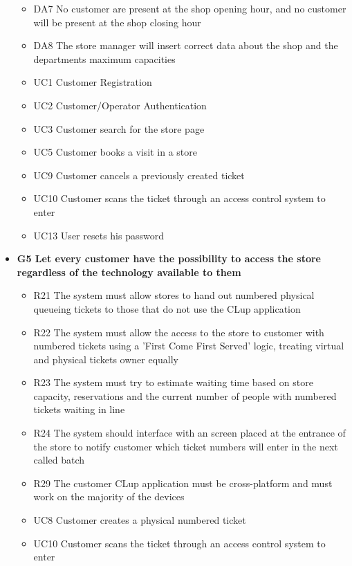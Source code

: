 \begin{itemize}
\begin{itemize}
        \item DA7 No customer are present at the shop opening hour, and no customer will be present at the shop closing hour
        \item DA8 The store manager will insert correct data about the shop and the departments maximum capacities
        \medskip
        \item UC1 Customer Registration
        \item UC2 Customer/Operator Authentication
        \item UC3 Customer search for the store page
        \item UC5 Customer books a visit in a store
        \item UC9 Customer cancels a previously created 
        ticket
        \item UC10 Customer scans the ticket through an access control system to enter
        \item UC13 User resets his password
    \end{itemize}
    \item \textbf{G5 Let every customer have the possibility to access the store regardless of the technology available to them}
    \begin{itemize}
        \item R21 The system must allow stores to hand out numbered physical queueing tickets to those that do not use the CLup application
        \item R22 The system must allow the access to the store to customer with numbered tickets using a ’First Come First Served’ logic, treating virtual and physical tickets owner equally
        \item R23 The system must try to estimate waiting time based on store capacity, reservations and the current number of people with numbered tickets waiting in line
        \item R24 The system should interface with an screen placed at the entrance of the store to notify customer which ticket numbers will enter in the next called batch
        \item R29 The customer CLup application must be cross-platform and must work on the majority of the devices
        \medskip
        \medskip
        \item UC8 Customer creates a physical numbered ticket
        \item UC10 Customer scans the ticket through an access control system to enter
    \end{itemize}

\end{itemize}

